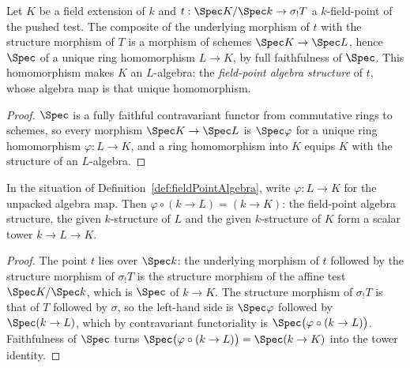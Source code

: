 \begin{definition}
  \label{def:fieldPointAlgebra}
  \leanok
  Let \(K\) be a field extension of \(k\) and
  \(t : \Spec K/\Spec k \to \sigma_{!}T\) a \(k\)-field-point of the pushed test. The
  composite of the underlying morphism of \(t\) with the structure morphism of \(T\)
  is a morphism of schemes \(\Spec K \to \Spec L\), hence \(\Spec\) of a unique ring
  homomorphism \(L \to K\), by full faithfulness of \(\Spec\). This homomorphism makes
  \(K\) an \(L\)-algebra: the \emph{field-point algebra structure} of \(t\), whose
  algebra map is that unique homomorphism.
\end{definition}
\begin{proof}
  \leanok
  \(\Spec\) is a fully faithful contravariant functor from commutative rings to
  schemes, so every morphism \(\Spec K \to \Spec L\) is \(\Spec\varphi\) for a unique
  ring homomorphism \(\varphi : L \to K\), and a ring homomorphism into \(K\) equips
  \(K\) with the structure of an \(L\)-algebra.
\end{proof}

\begin{lemma}
  \label{lem:isScalarTower_fieldPointAlgebra}
  \leanok
  In the situation of Definition~\ref{def:fieldPointAlgebra}, write
  \(\varphi : L \to K\) for the unpacked algebra map. Then
  \(\varphi \circ (k \to L) = (k \to K)\): the field-point algebra structure, the
  given \(k\)-structure of \(L\) and the given \(k\)-structure of \(K\) form a scalar
  tower \(k \to L \to K\).
\end{lemma}
\begin{proof}
  \leanok
  The point \(t\) lies over \(\Spec k\): the underlying morphism of \(t\) followed by
  the structure morphism of \(\sigma_{!}T\) is the structure morphism of the affine
  test \(\Spec K/\Spec k\), which is \(\Spec\) of \(k \to K\). The structure morphism
  of \(\sigma_{!}T\) is that of \(T\) followed by \(\sigma\), so the left-hand side is
  \(\Spec\varphi\) followed by \(\Spec(k \to L)\), which by contravariant
  functoriality is \(\Spec\bigl(\varphi \circ (k \to L)\bigr)\). Faithfulness of
  \(\Spec\) turns \(\Spec\bigl(\varphi \circ (k \to L)\bigr) = \Spec(k \to K)\) into
  the tower identity.
\end{proof}

